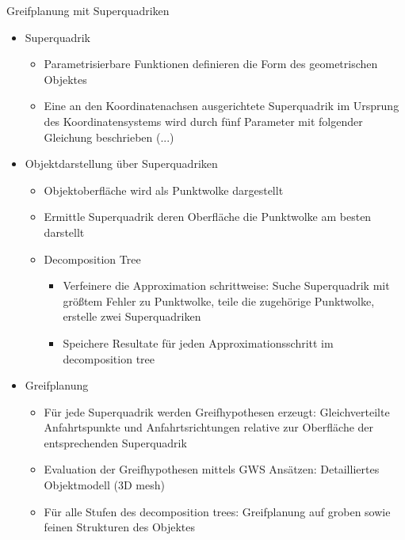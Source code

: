 \documentclass[paper=a4, fontsize=11pt]{scrartcl} %
\numberwithin{equation}{section} %
\numberwithin{figure}{section} %
\numberwithin{table}{section} %
\begin{document}
Greifplanung mit Superquadriken
\begin{itemize}
\item Superquadrik
\begin{itemize}
\item Parametrisierbare Funktionen definieren die Form des geometrischen Objektes
\item Eine an den Koordinatenachsen ausgerichtete Superquadrik im Ursprung des Koordinatensystems wird durch fünf Parameter mit folgender Gleichung beschrieben (...)
\end{itemize}
\item Objektdarstellung über Superquadriken
\begin{itemize}
\item Objektoberfläche wird als Punktwolke dargestellt
\item Ermittle Superquadrik deren Oberfläche die Punktwolke am besten darstellt
\item Decomposition Tree
\begin{itemize}
\item Verfeinere die Approximation schrittweise: Suche Superquadrik mit größtem Fehler zu Punktwolke, teile die zugehörige Punktwolke, erstelle zwei Superquadriken
\item Speichere Resultate für jeden Approximationsschritt im decomposition tree
\end{itemize}
\end{itemize}
\item Greifplanung
\begin{itemize}
\item Für jede Superquadrik werden Greifhypothesen erzeugt: Gleichverteilte Anfahrtspunkte und Anfahrtsrichtungen relative zur Oberfläche der entsprechenden Superquadrik
\item Evaluation der Greifhypothesen mittels GWS Ansätzen: Detailliertes Objektmodell (3D mesh)
\item Für alle Stufen des decomposition trees: Greifplanung auf groben sowie feinen Strukturen des Objektes
\end{itemize}
\end{itemize}
\end{document}
